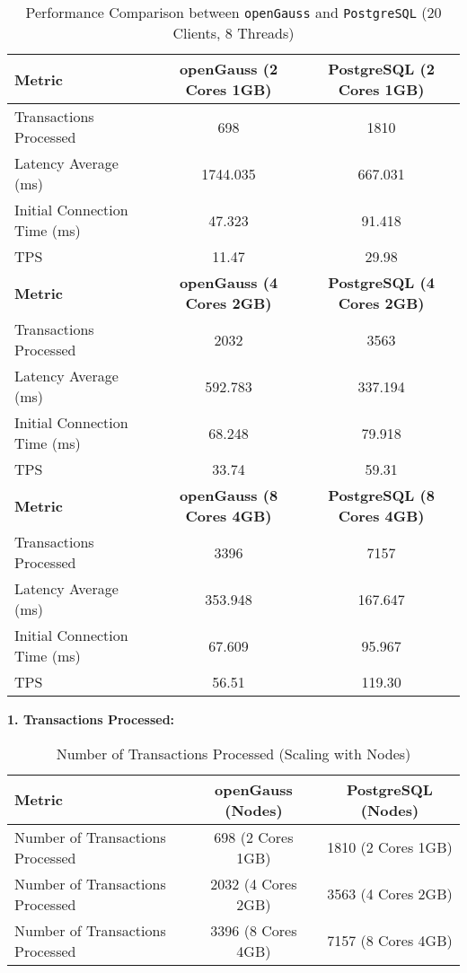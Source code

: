 \documentclass[12pt,a4paper,cs4size]{ctexart}
\begin{document}
\begin{table}[h!]
\centering
\captionsetup{labelformat=empty}
\begin{tabular}{|l|c|c|}
\hline
\textbf{Metric} & \textbf{openGauss (2 Cores 1GB)} & \textbf{PostgreSQL (2 Cores 1GB)} \\
\hline
Transactions Processed & 698 & 1810 \\
\hline
Latency Average (ms) & 1744.035 & 667.031 \\
\hline
Initial Connection Time (ms) & 47.323 & 91.418 \\
\hline
TPS & 11.47 & 29.98 \\
\hline
\hline
\textbf{Metric} & \textbf{openGauss (4 Cores 2GB)} & \textbf{PostgreSQL (4 Cores 2GB)} \\
\hline
Transactions Processed & 2032 & 3563 \\
\hline
Latency Average (ms) & 592.783 & 337.194 \\
\hline
Initial Connection Time (ms) & 68.248 & 79.918 \\
\hline
TPS & 33.74 & 59.31 \\
\hline
\hline
\textbf{Metric} & \textbf{openGauss (8 Cores 4GB)} & \textbf{PostgreSQL (8 Cores 4GB)} \\
\hline
Transactions Processed & 3396 & 7157 \\
\hline
Latency Average (ms) & 353.948 & 167.647 \\
\hline
Initial Connection Time (ms) & 67.609 & 95.967 \\
\hline
TPS & 56.51 & 119.30 \\
\hline
\end{tabular}
\caption{Performance Comparison between \texttt{openGauss} and \texttt{PostgreSQL} (20 Clients, 8 Threads)}
\end{table}

\vspace{0.5cm}

\textbf{1. Transactions Processed:}

\begin{table}[h!]
\centering
\captionsetup{labelformat=empty}
\begin{tabular}{|l|c|c|}
\hline
\textbf{Metric} & \textbf{openGauss (Nodes)} & \textbf{PostgreSQL (Nodes)} \\
\hline
Number of Transactions Processed & 698 (2 Cores 1GB) & 1810 (2 Cores 1GB) \\
\hline
Number of Transactions Processed & 2032 (4 Cores 2GB) & 3563 (4 Cores 2GB) \\
\hline
Number of Transactions Processed & 3396 (8 Cores 4GB) & 7157 (8 Cores 4GB) \\
\hline
\end{tabular}
\caption{Number of Transactions Processed (Scaling with Nodes)}
\end{table}
\end{document}

